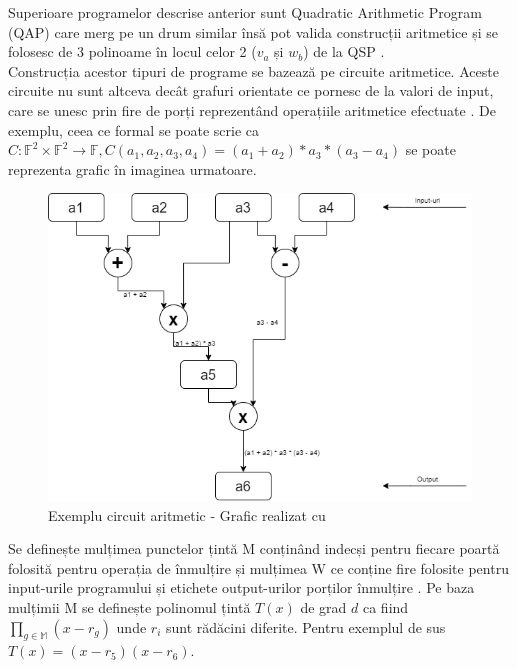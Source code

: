 Superioare programelor descrise anterior sunt Quadratic Arithmetic Program (QAP) care merg pe un drum similar însă pot valida construcții aritmetice și se folosesc de 3 polinoame în locul celor 2 ($v_a$ și $w_b$) de la QSP \cite{ZKS_Crypto_Basic}.\\

Construcția acestor tipuri de programe se bazează pe circuite aritmetice. Aceste circuite nu sunt altceva decât grafuri orientate ce pornesc de la valori de input, care se unesc prin fire de porți reprezentând operațiile aritmetice efectuate \cite{ZKS_Crypto_Basic3}. De exemplu, ceea ce formal se poate scrie ca $C: \mathbb{F}^2 \times \mathbb{F}^2 \rightarrow \mathbb{F}, C(a_1,a_2,a_3,a_4) = (a_1 + a_2) * a_3 * (a_3 - a_4)$ se poate reprezenta grafic în imaginea urmatoare.\\

\begin{figure}[H]
\centering
\includegraphics[scale=0.6]{Images/ZKS_QAP_Example.png}
\caption{Exemplu circuit aritmetic - Grafic realizat cu \cite{Diagrams}}
\end{figure}

Se definește mulțimea punctelor țintă M conținând indecși pentru fiecare poartă folosită pentru operația de înmulțire și mulțimea W ce conține fire folosite pentru input-urile programului și etichete output-urilor porților înmulțire \cite{ZKS_Crypto_Basic4}. Pe baza mulțimii M se definește polinomul țintă $T(x)$ de grad $d$ ca fiind $\prod_{g\in\mathbb{M}} (x - r_g)$ unde $r_i$ sunt rădăcini diferite. Pentru exemplul de sus $T(x) = (x-r_5)(x-r_6)$.\\

